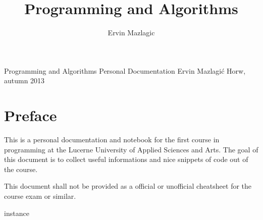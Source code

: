 \documentclass[a4paper,
               10pt,
               fleqn]{article}
\author{Ervin Mazlagic}
\title{Programming and Algorithms}
\begin{document}
	 {Programming and Algorithms}
         {Personal Documentation}
         {Ervin Mazlagi\'c}
         {Horw, autumn 2013}

\tableofcontents
\newpage

\section{Preface}
This is a personal documentation and notebook for the first course in 
programming at the Lucerne University of Applied Sciences and Arts.
The goal of this document is to collect useful informations and nice
snippets of code out of the course.

This document shall not be provided as a official or unofficial 
cheatsheet for the course exam or similar.

\gls{instance}






\begin{multicols}{2}

\glsaddall
\printglossaries

\end{multicols}
\end{document}

